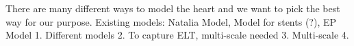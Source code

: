 

There are many different ways to model the heart and we want to pick the best way for our purpose.
Existing models: Natalia Model, Model for stents (?), EP Model
1. Different models
2. To capture ELT, multi-scale needed
3. Multi-scale
4. 


